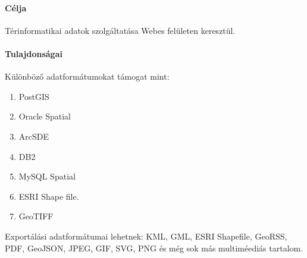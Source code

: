 \paragraph{Célja} Térinformatikai adatok szolgáltatása Webes felületen keresztül.

\paragraph{Tulajdonságai}
Különböző adatformátumokat támogat mint:
\begin{enumerate}
  \item PostGIS
  \item Oracle Spatial
  \item ArcSDE
  \item DB2
  \item MySQL Spatial
  \item ESRI Shape file.
  \item GeoTIFF
\end{enumerate}
Exportálási adatformátumai  lehetnek: KML, GML, ESRI Shapefile, GeoRSS, PDF, GeoJSON, JPEG, GIF, SVG, PNG és még sok más multiméediás tartalom.

  

